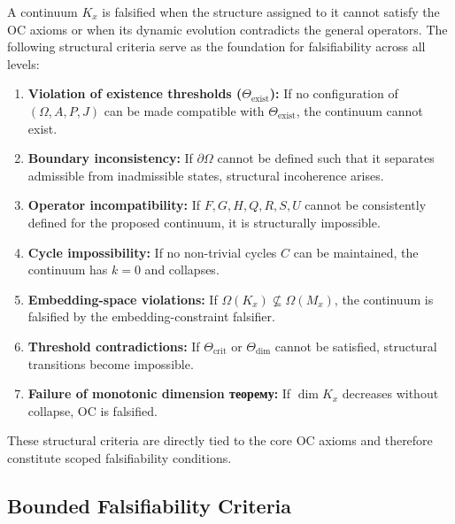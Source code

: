 A continuum $K_x$ is falsified when the structure assigned to it
cannot satisfy the OC axioms or when its dynamic evolution contradicts
the general operators.
The following structural criteria serve as the foundation for
falsifiability across all levels:

\begin{enumerate}
    \item \textbf{Violation of existence thresholds ($\Theta_{\mathrm{exist}}$):}
          If no configuration of $(\Omega, A, P, J)$ can be made compatible
          with $\Theta_{\mathrm{exist}}$, the continuum cannot exist.

    \item \textbf{Boundary inconsistency:}
          If $\partial\Omega$ cannot be defined such that it separates
          admissible from inadmissible states, structural incoherence arises.

    \item \textbf{Operator incompatibility:}
          If $F, G, H, Q, R, S, U$ cannot be consistently defined for the
          proposed continuum, it is structurally impossible.

    \item \textbf{Cycle impossibility:}
          If no non-trivial cycles $C$ can be maintained, the continuum has
          $k=0$ and collapses.

    \item \textbf{Embedding-space violations:}
          If $\Omega(K_x) \not\subseteq \Omega(M_x)$, the continuum is
          falsified by the embedding-constraint falsifier.

    \item \textbf{Threshold contradictions:}
          If $\Theta_{\mathrm{crit}}$ or $\Theta_{\mathrm{dim}}$ cannot be
          satisfied, structural transitions become impossible.

    \item \textbf{Failure of monotonic dimension теорему:}
          If $\dim K_x$ decreases without collapse, OC is falsified.
\end{enumerate}

These structural criteria are directly tied to the core OC axioms and
therefore constitute scoped falsifiability conditions.



\subsection{Bounded Falsifiability Criteria}

